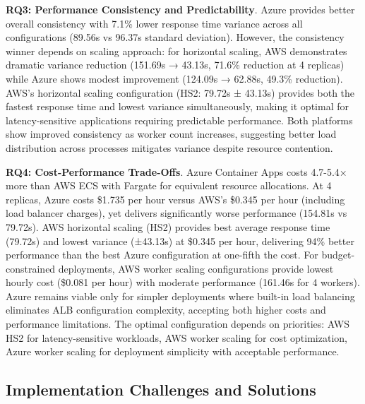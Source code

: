 \textbf{RQ3: Performance Consistency and Predictability}. Azure provides better overall consistency with 7.1\% lower response time variance across all configurations (89.56s vs 96.37s standard deviation). However, the consistency winner depends on scaling approach: for horizontal scaling, AWS demonstrates dramatic variance reduction (151.69s → 43.13s, 71.6\% reduction at 4 replicas) while Azure shows modest improvement (124.09s → 62.88s, 49.3\% reduction). AWS's horizontal scaling configuration (HS2: 79.72s ± 43.13s) provides both the fastest response time and lowest variance simultaneously, making it optimal for latency-sensitive applications requiring predictable performance. Both platforms show improved consistency as worker count increases, suggesting better load distribution across processes mitigates variance despite resource contention.

\textbf{RQ4: Cost-Performance Trade-Offs}. Azure Container Apps costs 4.7-5.4× more than AWS ECS with Fargate for equivalent resource allocations. At 4 replicas, Azure costs \$1.735 per hour versus AWS's \$0.345 per hour (including load balancer charges), yet delivers significantly worse performance (154.81s vs 79.72s). AWS horizontal scaling (HS2) provides best average response time (79.72s) and lowest variance (±43.13s) at \$0.345 per hour, delivering 94\% better performance than the best Azure configuration at one-fifth the cost. For budget-constrained deployments, AWS worker scaling configurations provide lowest hourly cost (\$0.081 per hour) with moderate performance (161.46s for 4 workers). Azure remains viable only for simpler deployments where built-in load balancing eliminates ALB configuration complexity, accepting both higher costs and performance limitations. The optimal configuration depends on priorities: AWS HS2 for latency-sensitive workloads, AWS worker scaling for cost optimization, Azure worker scaling for deployment simplicity with acceptable performance.

\subsection{Implementation Challenges and Solutions}

